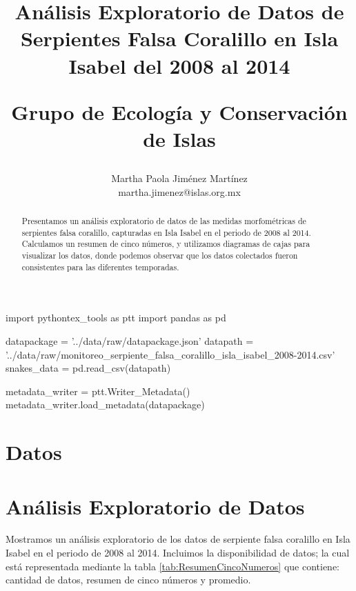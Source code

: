 \documentclass{article}
\begin{document}
 

\begin{pycode}
import pythontex_tools as ptt
import pandas as pd

datapackage = '../data/raw/datapackage.json'
datapath = '../data/raw/monitoreo_serpiente_falsa_coralillo_isla_isabel_2008-2014.csv'
snakes_data = pd.read_csv(datapath)

metadata_writer = ptt.Writer_Metadata() 
metadata_writer.load_metadata(datapackage)

\end{pycode}

\author{Martha Paola Jiménez Martínez \\ 
\small{martha.jimenez@islas.org.mx}} \title{Análisis Exploratorio de Datos de Serpientes Falsa Coralillo en Isla Isabel del 2008 al 2014\\
\begin{large} Grupo de Ecología y Conservación de Islas \end{large}}  

\maketitle

\begin{abstract}
Presentamos un análisis exploratorio de datos de las medidas morfométricas de 
serpientes falsa coralillo, capturadas en Isla  Isabel en el periodo de 2008 al 2014. Calculamos un
resumen de cinco números, y utilizamos diagramas de cajas para visualizar los datos, donde podemos
observar que los datos colectados fueron consistentes para las diferentes temporadas.
\end{abstract}

\section*{Datos}

\section*{Análisis Exploratorio de Datos}
Mostramos un análisis exploratorio de los datos de serpiente falsa coralillo en Isla Isabel en el
periodo de 2008 al 2014. Incluimos la disponibilidad de datos; la cual está representada mediante la
tabla \ref{tab:ResumenCincoNumeros} que contiene: cantidad de datos, resumen de cinco números y
promedio.
\end{document}

